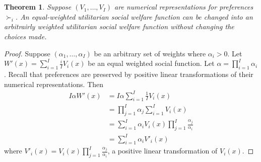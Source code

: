 \documentclass[12pt]{article}
\newtheorem{thm}{Theorem}[section]
\theoremstyle{definition}
\theoremstyle{remark}
\begin{document}
\maketitle
%
%
\section{}
\begin{thm}
  Suppose $(V_1, \ldots, V_I)$ are numerical representations for preferences $\succ_i$. An equal-weighted utilitarian social welfare function can be changed into an arbitrairly weighted utilitarian social welfare function without changing the choices made.
\end{thm}
\begin{proof}
  Suppose $(\alpha_1, \ldots, \alpha_I)$ be an arbitrary set of weights where $\alpha_i > 0$. Let $W'(x) = \sum_{i = 1}^I \frac{i}{I}V_i(x)$ be an equal weighted social function. Let $\alpha = \prod_{i = 1}^I \alpha_i$. Recall that preferences are preserved by positive linear transformations of their numerical representations. Then
  \begin{align*}
    I \alpha W'(x) &= I \alpha \sum_{i = 1}^I \frac{1}{I} V_i(x) \\
    &= \prod_{j = 1}^I \alpha_j \sum_{i = 1}^I V_i(x) \\
    &= \sum_{i = 1}^I \alpha_i V_i(x) \prod_{j = 1}^I \frac{\alpha_j}{\alpha_i} \\
    &= \sum_{i = 1}^I \alpha_i V'_i(x)
  \end{align*}
  where $V'_i(x) = V_i(x) \prod_{j = 1}^I \frac{\alpha_j}{\alpha_i}$, a positive linear transformation of $V_i(x)$.
\end{proof}
%
%
\end{document}
